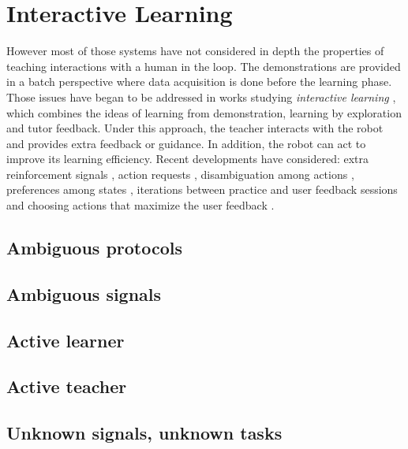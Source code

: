 \section{Interactive Learning}

However most of those systems have not considered in depth the properties of teaching interactions with a human in the loop. The demonstrations are provided in a batch perspective where data acquisition is done before the learning phase. Those issues have began to be addressed in works studying \textit{interactive learning} \cite{kaplan2002robotic,nicolescu2003natural,Breazeal2004,thomaz2008teachable}, which combines the ideas of learning from demonstration, learning by exploration and tutor feedback. Under this approach, the teacher interacts with the robot and provides extra feedback or guidance. In addition, the robot can act to improve its learning efficiency. Recent developments have considered: extra reinforcement signals \cite{thomaz2008teachable}, action requests \cite{macl09airl}, disambiguation among actions \cite{chernova09jair}, preferences among states \cite{Mason2011}, iterations between practice and user feedback sessions \cite{judah2010reinforcement} and choosing actions that maximize the user feedback \cite{knox2009interactively}.

\subsection{Ambiguous protocols}

\subsection{Ambiguous signals}

\subsection{Active learner}

\subsection{Active teacher}

\subsection{Unknown signals, unknown tasks}

